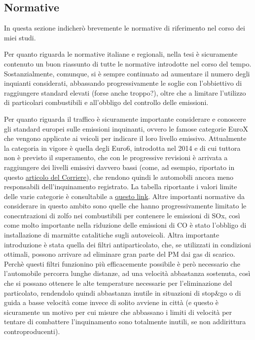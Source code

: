 \documentclass{article}
\begin{document}
\subsection{Normative}
\label{subsec:normative}
In questa sezione indicherò brevemente le normative di riferimento nel corso dei miei studi.

Per quanto riguarda le normative italiane e regionali, nella tesi\cite{scolari2017evoluzione} è sicuramente contenuto un buon riassunto di tutte le normative introdotte nel corso del tempo. Sostanzialmente, comunque, si è sempre continuato ad aumentare il numero degli inquianti considerati, abbassando progressivamente le soglie con l'obbiettivo di raggiungere standard elevati (forse anche troppo?), oltre che a limitare l'utilizzo di particolari combustibili e all'obbligo del controllo delle emissioni. 

Per quanto riguarda il traffico è sicuramente importante considerare e conoscere gli standard europei sulle emissioni inquinanti, ovvero le famose categorie EuroX che vengono applicate ai veicoli per indicare il loro livello emissivo. Attualmente la categoria in vigore è quella degli Euro6, introdotta nel 2014 e di cui tuttora non è previsto il superamento, che con le progressive revisioni è arrivata a raggiungere dei livelli emissivi davvero bassi (come, ad esempio, riportato in questo \href{https://motori.corriere.it/motori/attualita/20_aprile_27/sorpresa-diesel-non-inquina-quasi-piu-ma-restano-pregiudizi-0003501e-886a-11ea-96e3-c7b28bb4a705.shtml}{articolo del Corriere}), che rendono quindi le automobili ancora meno responsabili dell'inquinamento registrato. La tabella riportante i valori limite delle varie categorie è consultabile a \href{https://en.wikipedia.org/wiki/European_emission_standards}{questo link}. 
Altre importanti normative da considerare in questo ambito sono quelle che hanno progressivamente limitato le conecntrazioni di zolfo nei combustibili per contenere le emissioni di SOx, così come molto importante nella riduzione delle emissioni di CO è stato l'obbligo di installazione di marmitte catalitiche sugli autoveicoli. Altra importante introduzione è stata quella dei filtri antiparticolato, che, se utilizzati in condizioni ottimali, possono arrivare ad eliminare gran parte del PM dai gas di scarico. Perchè questi filtri funzionino più efficacemente possibile è però necessario che l'automobile percorra lunghe distanze, ad una velocità abbastanza sostenuta, così che si possano ottenere le alte temperature necessarie per l'eliminazione del particolato, rendendolo quindi abbastanza inutile in situazioni di stop\&go o di guida a basse velocità come invece di solito avviene in città (e questo è sicuramente un motivo per cui misure che abbassano i limiti di velocità per tentare di combattere l'inquinamento sono totalmente inutili, se non addirittura controproducenti).
 
\end{document}
